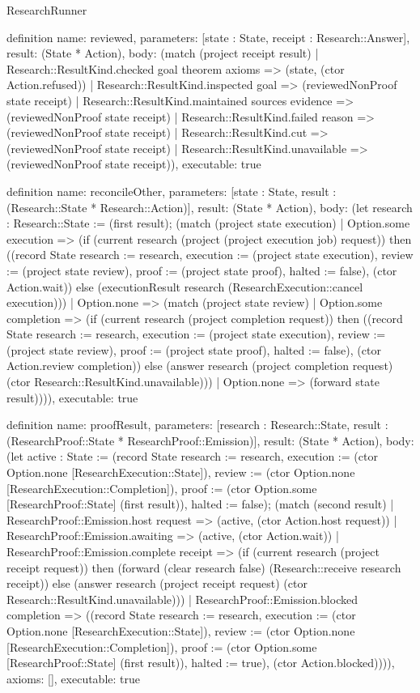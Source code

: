 \begin{lexlean}{ResearchRunner}
\begin{semanticmodule}
definition{
  name: reviewed,
  parameters: [state : State, receipt : Research::Answer],
  result: (State * Action),
  body: (match (project receipt result) | Research::ResultKind.checked goal theorem axioms => (state, (ctor Action.refused)) | Research::ResultKind.inspected goal => (reviewedNonProof state receipt) | Research::ResultKind.maintained sources evidence => (reviewedNonProof state receipt) | Research::ResultKind.failed reason => (reviewedNonProof state receipt) | Research::ResultKind.cut => (reviewedNonProof state receipt) | Research::ResultKind.unavailable => (reviewedNonProof state receipt)),
  executable: true
}

definition{
  name: reconcileOther,
  parameters: [state : State, result : (Research::State * Research::Action)],
  result: (State * Action),
  body: (let research : Research::State := (first result); (match (project state execution)
    | Option.some execution => (if (current research (project (project execution job) request)) then ((record State {research := research, execution := (project state execution), review := (project state review), proof := (project state proof), halted := false}), (ctor Action.wait)) else (executionResult research (ResearchExecution::cancel execution)))
    | Option.none => (match (project state review)
      | Option.some completion => (if (current research (project completion request)) then ((record State {research := research, execution := (project state execution), review := (project state review), proof := (project state proof), halted := false}), (ctor Action.review completion)) else (answer research (project completion request) (ctor Research::ResultKind.unavailable)))
      | Option.none => (forward state result)))),
  executable: true
}

definition{
  name: proofResult,
  parameters: [research : Research::State, result : (ResearchProof::State * ResearchProof::Emission)],
  result: (State * Action),
  body: (let active : State := (record State {research := research, execution := (ctor Option.none [ResearchExecution::State]), review := (ctor Option.none [ResearchExecution::Completion]), proof := (ctor Option.some [ResearchProof::State] (first result)), halted := false}); (match (second result)
    | ResearchProof::Emission.host request => (active, (ctor Action.host request))
    | ResearchProof::Emission.awaiting => (active, (ctor Action.wait))
    | ResearchProof::Emission.complete receipt => (if (current research (project receipt request)) then (forward (clear research false) (Research::receive research receipt)) else (answer research (project receipt request) (ctor Research::ResultKind.unavailable)))
    | ResearchProof::Emission.blocked completion => ((record State {research := research, execution := (ctor Option.none [ResearchExecution::State]), review := (ctor Option.none [ResearchExecution::Completion]), proof := (ctor Option.some [ResearchProof::State] (first result)), halted := true}), (ctor Action.blocked)))),
  axioms: [],
  executable: true
}


\end{semanticmodule}
\end{lexlean}
